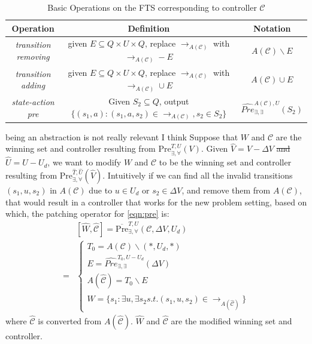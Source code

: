 \begin{table}
	\centering
	\caption{Basic Operations on the FTS corresponding to controller $ \mathcal{C} $}
	\begin{tabular}{ccc}
		\hline
		Operation & Definition & Notation\\
		\hline
		\emph{transition removing} & given $ E\subseteq Q\times U\times Q $, replace $ \rightarrow_{A(\mathcal{C})} $ with $\rightarrow_{A(\mathcal{C})} - E$ & $ A(\mathcal{C})\backslash E $\\
		\emph{transition adding} & given $ E\subseteq Q\times U\times Q $, replace $ \rightarrow_{A(\mathcal{C})} $ with $ \rightarrow_{A(\mathcal{C})}\cup E $ & $ A(\mathcal{C})\cup E $\\
		\emph{state-action pre} &  Given $ S_2\subseteq Q $, output $ \{(s_1,a): (s_1,a,s_2)\in \rightarrow_{A(\mathcal{C})}, s_2\in S_2\} $ & $ \widehat{Pre}^{A(\mathcal{C}),U}_{\exists,\exists}(S_2) $\\
		\hline
	\end{tabular}
	\label{tab:oper}
\end{table}

{\color{red}being an abstraction is not really relevant I think} 
Suppose that  $ W $ and $ \mathcal{C} $ are the winning set and controller resulting from $ \text{Pre}_{\exists,\forall}^{T, U}(V) $. Given $ \widehat{V}= V-\Delta V $ {\color{teal}\sout{and $ \widehat{U} = U-U_d $}}, we want to modify $ W $ and $ \mathcal{C} $ to be the winning set and controller resulting from $ \text{Pre}_{\exists,\forall}^{\widehat{T},\widehat{U}}(\widehat{V}) $. Intuitively if we can find all the invalid transitions $ (s_1,u,s_2) $ in $ A(\mathcal{C}) $ due to $ u\in U_d $ or $ s_2\in\Delta V $, and remove them from $ A(\mathcal{C}) $, that would result in a controller that works for the new problem setting, based on which, the patching operator for \eqref{eqn:pre} is:
{\small
\begin{align}
&[\widehat{W},\widehat{\mathcal{C}}]=\overline{\text{Pre}}_{\exists,\forall}^{T, U}(\mathcal{C},\Delta V,U_d)\nonumber\\
=&\begin{cases} 
T_{0} = A(\mathcal{C})\backslash (*,U_d,*)\\
E =  \widehat{Pre}^{T_0,U-U_d}_{\exists,\exists}(\Delta V)\\
A(\widehat{\mathcal{C}}) = T_{0}\backslash E\\
\widehat{W} = \{s_1: \exists u, \exists s_2 s.t. (s_1,u, s_2)\in \rightarrow_{A(\widehat{\mathcal{C}})} \}
\end{cases}\label{patch-pre}
\end{align}}
where $ \widehat{\mathcal{C}} $ is converted from $ A(\widehat{\mathcal{C}}) $. $ \widehat{W} $ and $ \widehat{\mathcal{C}} $ are the modified winning set and controller.

